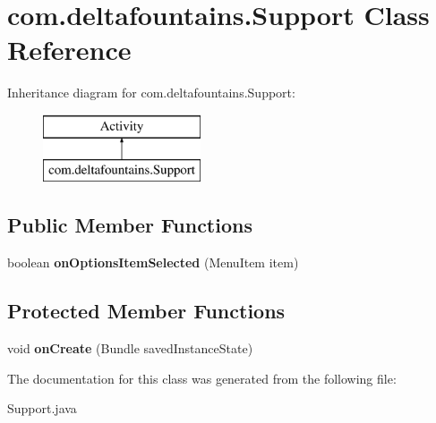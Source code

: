 \hypertarget{classcom_1_1deltafountains_1_1Support}{\section{com.\-deltafountains.\-Support Class Reference}
\label{classcom_1_1deltafountains_1_1Support}
}
Inheritance diagram for com.\-deltafountains.\-Support\-:\begin{figure}[H]
\begin{center}
\leavevmode
\includegraphics[height=2.000000cm]{classcom_1_1deltafountains_1_1Support}
\end{center}
\end{figure}
\subsection*{Public Member Functions}
\begin{DoxyCompactItemize}
\item 
\hypertarget{classcom_1_1deltafountains_1_1Support_ac26a3d1ea1a57b75119b729a5cd33cae}{boolean {\bfseries on\-Options\-Item\-Selected} (Menu\-Item item)}\label{classcom_1_1deltafountains_1_1Support_ac26a3d1ea1a57b75119b729a5cd33cae}

\end{DoxyCompactItemize}
\subsection*{Protected Member Functions}
\begin{DoxyCompactItemize}
\item 
\hypertarget{classcom_1_1deltafountains_1_1Support_ada4d19e2f16dea46b8973ab7cb443de5}{void {\bfseries on\-Create} (Bundle saved\-Instance\-State)}\label{classcom_1_1deltafountains_1_1Support_ada4d19e2f16dea46b8973ab7cb443de5}

\end{DoxyCompactItemize}


The documentation for this class was generated from the following file\-:\begin{DoxyCompactItemize}
\item 
Support.\-java\end{DoxyCompactItemize}
